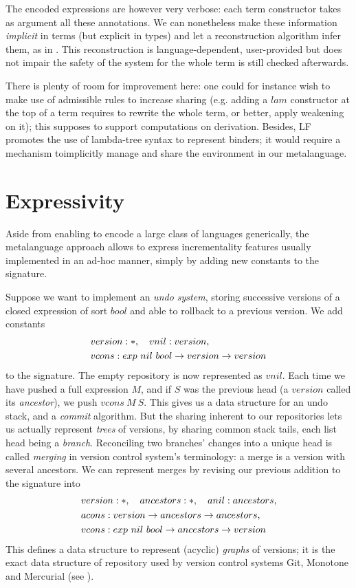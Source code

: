 \documentclass[9pt,authoryear]{sigplanconf}
\begin{document}
The encoded expressions are however very verbose: each term
constructor takes as argument all these annotations. We can
nonetheless make these information \emph{implicit} in terms (but
explicit in types) and let a reconstruction algorithm infer them, as
in \cite{necula1997efficient}. This reconstruction is
language-dependent, user-provided but does not impair the safety of
the system for the whole term is still checked afterwards.

There is plenty of room for improvement here: one could for instance
wish to make use of admissible rules to increase sharing (e.g. adding
a $lam$ constructor at the top of a term requires to rewrite the whole
term, or better, apply weakening on it); this supposes to support
computations on derivation. Besides, LF promotes the use of
lambda-tree syntax to represent binders; it would require a mechanism
toimplicitly manage and share the environment in our metalanguage.

\section{Expressivity}

Aside from enabling to encode a large class of languages generically,
the metalanguage approach allows to express incrementality features
usually implemented in an ad-hoc manner, simply by adding new
constants to the signature.

Suppose we want to implement an \emph{undo system}, storing successive
versions of a closed expression of sort $bool$ and able to rollback to
a previous version. We add constants
\begin{align*}
  &version : \mathsf{*},\quad vnil : version,\\
  &vcons : exp\ nil\ bool \to version \to version
\end{align*}
to the signature. The empty repository is now represented as
$vnil$. Each time we have pushed a full expression $M$, and if $S$ was
the previous head (a $version$ called its \emph{ancestor}), we push
$vcons\ M\ S$. This gives us a data structure for an undo stack, and a
\emph{commit} algorithm. But the sharing inherent to our repositories
lets us actually represent \emph{trees} of versions, by sharing common
stack tails, each list head being a \emph{branch}. Reconciling two
branches' changes into a unique head is called \emph{merging} in
version control system's terminology: a merge is a version with
several ancestors. We can represent merges by revising our previous
addition to the signature into
\begin{align*}
  &version : \mathsf{*},\quad ancestors : \mathsf{*},\quad anil : ancestors,\\
  &acons : version \to ancestors \to ancestors,\\
  &vcons : exp\ nil\ bool \to ancestors \to version
\end{align*}
This defines a data structure to represent (acyclic) \emph{graphs} of
versions; it is the exact data structure of repository used by version
control systems \textsf{Git}, \textsf{Monotone} and \textsf{Mercurial}
(see \cite{baudis2009current}).
\end{document}
